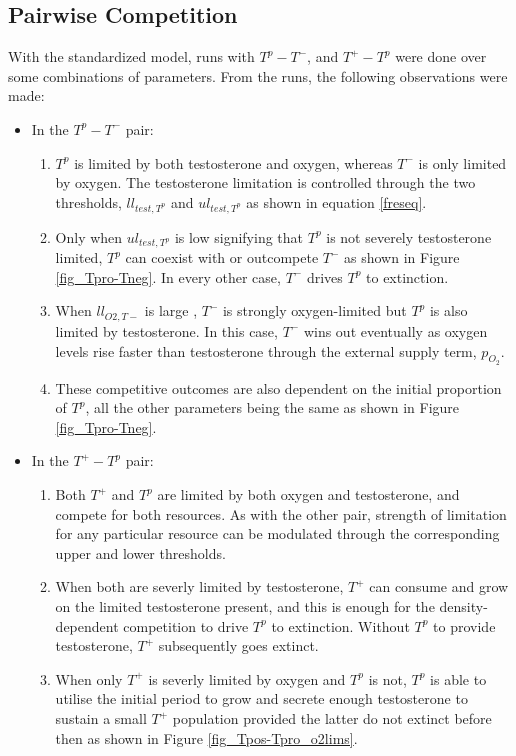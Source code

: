 \documentclass[a4paper]{article}
\begin{document}
\subsection{Pairwise Competition}
With the standardized model, runs with $T^p - T^-$, and $T^+ - T^p$ were done over some combinations of parameters. From the runs, the following observations were made:
\begin{itemize}
  \item In the $T^p - T^-$ pair:
  \begin{enumerate}
    \item $T^p$ is limited by both testosterone and oxygen, whereas $T^-$ is only limited by oxygen. The testosterone limitation is controlled through the two thresholds, $ll_{test,T^p}$ and $ul_{test,T^p}$ as shown in equation \ref{freseq}.
    \item Only when $ul_{test,T^p}$ is low signifying that $T^p$ is not severely testosterone limited, $T^p$ can coexist with or outcompete $T^-$ as shown in Figure \ref{fig_Tpro-Tneg}. In every other case, $T^-$ drives $T^p$ to extinction.
    \item  When $ll_{O2,T-}$ is large , $T^-$ is strongly oxygen-limited but $T^p$ is also limited by testosterone. In this case, $T^-$ wins out eventually as oxygen levels rise faster than testosterone through the external supply term, $p_{O_2}$.
    \item These competitive outcomes are also dependent on the initial proportion of $T^p$, all the other parameters being the same as shown in Figure \ref{fig_Tpro-Tneg}.
  \end{enumerate}
  \item In the $T^+ - T^p$ pair:
  \begin{enumerate}
    \item Both $T^+$ and $T^p$ are limited by both oxygen and testosterone, and compete for both resources. As with the other pair, strength of limitation for any particular resource can be modulated through the corresponding upper and lower thresholds.
    \item When both are severly limited by testosterone, $T^+$ can consume and grow on the limited testosterone present, and this is enough for the density-dependent competition to drive $T^p$ to extinction. Without $T^p$ to provide testosterone, $T^+$ subsequently goes extinct.
    \item When only $T^+$ is severly limited by oxygen and $T^p$ is not, $T^p$ is able to utilise the initial period to grow and secrete enough testosterone to sustain a small $T^+$ population provided the latter do not extinct before then as shown in Figure \ref{fig_Tpos-Tpro_o2lims}.

\end{enumerate}
\end{itemize}
\end{document}
